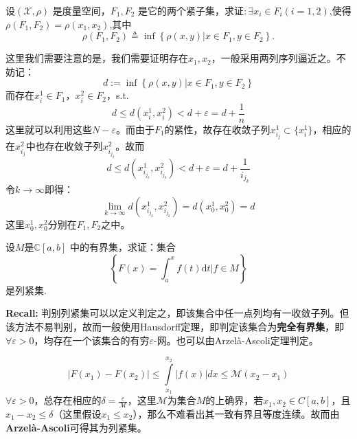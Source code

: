 \begin{exercise}
    设$(\mathscr{X},\rho)$ 是度量空间，$F_1,F_2$ 是它的两个紧子集，求证$:\exists x_i\in F_i(i=1,2)$,使得 $\rho(F_1,F_2)=\rho(x_1,x_2)$,其中
    \begin{equation*}
        \rho(F_1,F_2)\triangleq\inf\left\{\left.\rho(x,y)\right|x\in F_1,y\in F_2\right\}.
    \end{equation*}
\end{exercise}
\begin{solution}
    这里我们需要注意的是，我们需要证明存在$x_1, x_2$，一般采用两列序列逼近之。不妨记：
    \begin{equation*}
        d := \inf\left\{\left.\rho(x,y)\right|x\in F_1,y\in F_2\right\}
    \end{equation*}
    而存在$x^1_i\in F_1$，$x^2_i\in F_2$，s.t.
    \begin{equation*}
        d \le d(x^1_i, x^2_i) < d + \varepsilon  = d + \frac{1}{n}
    \end{equation*}
    这里就可以利用这些$N - \varepsilon$。而由于$F_1$的紧性，故存在收敛子列$x^1_{i_j}\subset\{x^1_i\}$，相应的在$x^2_{i_j}$中也存在收敛子列$x^2_{i_{j_k}}$。故而
    \begin{equation*}
        d \le d(x^1_{i_{j_k}}, x^2_{i_{j_k}}) < d + \varepsilon  = d + \frac{1}{i_{j_k}}
    \end{equation*}
    令$k\to\infty$即得：
    \begin{equation*}
        \lim\limits_{k\to\infty} d(x^1_{i_{j_k}}, x^2_{i_{j_k}}) = d(x^1_0, x^2_0) = d
    \end{equation*}
    这里$x^1_0, x^2_0$分别在$F_1, F_2$之中。
\end{solution}

\begin{exercise}
    设$M$是$\mathbb{C}[a,b]$ 中的有界集，求证：集合
    \begin{equation*}
        \left\{F(x)=\int_a^xf(t)\mathrm{d}t|f\in M\right\}
    \end{equation*}
    是列紧集.
\end{exercise}
\begin{solution}
    \textbf{Recall: }判别列紧集可以以定义判定之，即该集合中任一点列均有一收敛子列。但该方法不易判别，故而一般使用Hausdorff定理，即判定该集合为\textbf{完全有界集}，即$\forall\varepsilon>0$，均存在一个该集合的有穷$\varepsilon$-网。也可以由Arzelà-Ascoli定理判定。

    \begin{equation*}
        \left| F(x_1) - F(x_2) \right| \le \int\limits_{x_1}^{x_2} \left| f(x)\right| dx \le \mathscr{M}(x_2 - x_1) 
    \end{equation*}
    $\forall \varepsilon>0$，总存在相应的$\delta = \frac{\varepsilon}{\mathscr{M}}$，这里$\mathscr{M}$为集合$M$的上确界，若$x_1, x_2\in C[a, b]$，且$x_1 - x_2 \le \delta$（这里假设$x_1\le x_2$），那么不难看出其一致有界且等度连续。故而由\textbf{Arzelà-Ascoli}可得其为列紧集。
\end{solution}

